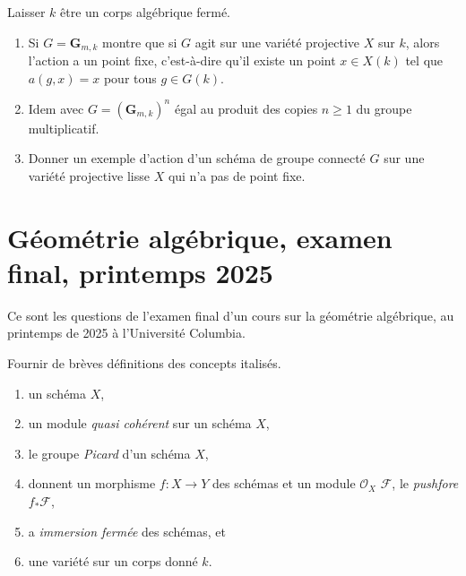 \begin{exercise}
\label{exercise-fix-points}
Laisser $k$ être un corps algébrique fermé.
\begin{enumerate}
\item Si $G = \mathbf{G}_{m, k}$ montre que si $G$ agit sur
une variété projective $X$ sur $k$, alors l'action a un point fixe, c'est-à-dire qu'il
existe un point $x \in X(k)$ tel que $a(g, x) = x$ pour tous
$g \in G(k)$.
\item Idem avec $G = (\mathbf{G}_{m, k})^n$ égal au produit des
copies $n \geq 1$ du groupe multiplicatif.
\item Donner un exemple d'action d'un schéma de groupe connecté $G$
sur une variété projective lisse $X$ qui n'a pas de point fixe.
\end{enumerate}
\end{exercise}



\section{ Géométrie algébrique, examen final, printemps 2025}
\label{section-final-exam-spring-2025}

\noindent
Ce sont les questions de l'examen final d'un cours sur la géométrie algébrique,
au printemps de 2025 à l'Université Columbia.

\begin{exercise}[Definitions]
\label{exercise-definitions-spring-2025}
Fournir de brèves définitions des concepts italisés.
\begin{enumerate}
\item un schéma {\it} $X$,
\item un module {\it quasi cohérent} sur un schéma $X$,
\item le groupe {\it Picard} d'un schéma $X$,
\item donnent un morphisme $f : X \to
Y$ des schémas et un module $\mathcal{O}_X$ $\mathcal{F}$, le {\it pushfore} $f_*\mathcal{F}$,
\item a {\it immersion fermée} des schémas, et
\item une variété {\it} sur un corps donné $k$.
\end{enumerate}
\end{exercise}

